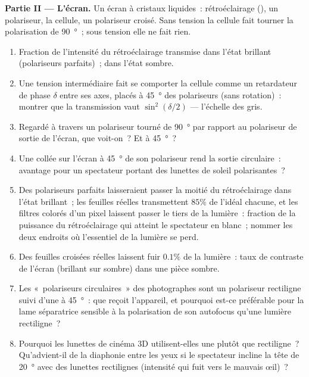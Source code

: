 \begin{problem}
\medskip
\noindent\textbf{Partie II --- L'écran.}
Un écran à cristaux liquides~: rétroéclairage (), un polariseur, la
cellule, un polariseur croisé. Sans tension la cellule fait tourner la
polarisation de \qty{90}{\degree}~; sous tension elle ne fait rien.
\begin{enumerate}[resume]
  \item Fraction de l'intensité du rétroéclairage transmise dans l'état
        brillant (polariseurs parfaits)~; dans l'état sombre.
  \item Une tension intermédiaire fait se comporter la cellule comme un retardateur
        de phase $\delta$ entre ses axes, placés à \qty{45}{\degree} des
        polariseurs (sans rotation)~: montrer que la transmission vaut
        $\sin^2(\delta/2)$ --- l'échelle des gris.
  \item Regardé à travers un polariseur tourné de \qty{90}{\degree} par rapport au
        polariseur de sortie de l'écran, que voit-on~? Et à \qty{45}{\degree}~?
  \item Une  collée sur l'écran à \qty{45}{\degree} de son
        polariseur rend la sortie circulaire~: avantage pour un spectateur
        portant des lunettes de soleil polarisantes~?
  \item Des polariseurs parfaits laisseraient passer la moitié du rétroéclairage dans l'état
        brillant~; les feuilles réelles transmettent $85\%$ de l'idéal chacune, et
        les filtres colorés d'un pixel laissent passer le tiers de la lumière~:
        fraction de la puissance du rétroéclairage qui atteint le spectateur en blanc~;
        nommer les deux endroits où l'essentiel de la lumière se perd.
  \item Des feuilles croisées réelles laissent fuir $0.1\%$ de la lumière~: taux de contraste
        de l'écran (brillant sur sombre) dans une pièce sombre.
  \item Les «~polariseurs circulaires~» des photographes sont un polariseur rectiligne
        suivi d'une  à \qty{45}{\degree}~: que reçoit
        l'appareil, et pourquoi est-ce préférable pour la lame séparatrice sensible à
        la polarisation de son autofocus qu'une lumière
        rectiligne~?
  \item Pourquoi les lunettes de cinéma 3D utilisent-elles une  plutôt que
        rectiligne~? Qu'advient-il de la diaphonie entre les yeux
        si le spectateur incline la tête de \qty{20}{\degree} avec des lunettes
        rectilignes (intensité qui fuit vers le mauvais œil)~?
\end{enumerate}


\end{problem}
